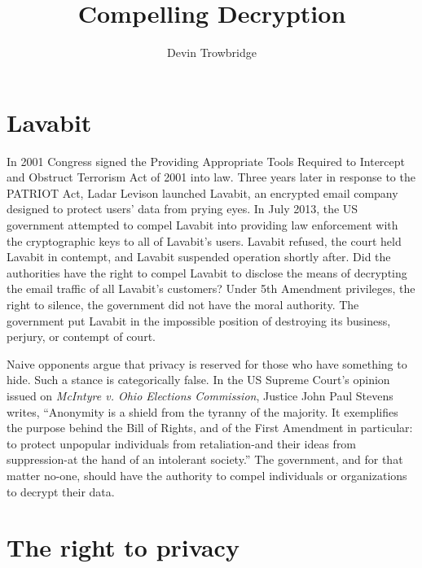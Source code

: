 \documentclass[format=sigconf]{acmart}
\title{Compelling Decryption}
\author{Devin Trowbridge}
\affiliation{%
  \department{Computer Science and Software Engineering}
  \institution{Auburn University}
  \email{dkt0003@auburn.edu}
  \city{Huntsville}
  \state{Alabama}
  \country{United States}
}
\begin{document}
\maketitle

\section{Lavabit}

In 2001 Congress signed the Providing Appropriate Tools Required to Intercept and Obstruct Terrorism Act of 2001 into law. Three years later in response to the PATRIOT Act, Ladar Levison launched Lavabit, an encrypted email company designed to protect users' data from prying eyes. In July 2013, the US government attempted to compel Lavabit into providing law enforcement with the cryptographic keys to all of Lavabit's users. Lavabit refused, the court held Lavabit in contempt, and Lavabit suspended operation shortly after. \cite{lavabit} Did the authorities have the right to compel Lavabit to disclose the means of decrypting the email traffic of all Lavabit's customers? Under 5th Amendment privileges, the right to silence, the government did not have the moral authority. The government put Lavabit in the impossible position of destroying its business, perjury, or contempt of court. 

Naive opponents argue that privacy is reserved for those who have something to hide. Such a stance is categorically false. In the US Supreme Court's opinion issued on \textit{McIntyre v. Ohio Elections Commission}, Justice John Paul Stevens writes, ``Anonymity is a shield from the tyranny of the majority. It exemplifies the purpose behind the Bill of Rights, and of the First Amendment in particular: to protect unpopular individuals from retaliation-and their ideas from suppression-at the hand of an intolerant society.'' \cite{stevens} The government, and for that matter no-one, should have the authority to compel individuals or organizations to decrypt their data.

\section{The right to privacy}
\end{document}
